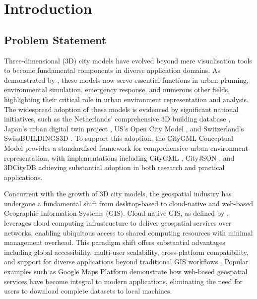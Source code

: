 
\chapter{Introduction}%
\label{introduction}

\section{Problem Statement}
\label{introduction:problem_statement}
Three-dimensional (3D) city models have evolved beyond mere visualisation tools to become fundamental components in diverse application domains.
As demonstrated by \citet{biljecki_2015}, these models now serve essential functions in urban planning, environmental simulation, emergency response, and numerous other fields, highlighting their critical role in urban environment representation and analysis.
The widespread adoption of these models is evidenced by significant national initiatives, such as the Netherlands' comprehensive 3D building database \citep{3dbag}, Japan's urban digital twin project \citep{plateau}, US's Open City Model \citep{us_buildings3d}, and Switzerland's SwissBUILDINGS3D \citep{swiss_buildings3d}.
To support this adoption, the CityGML Conceptual Model \citep{CityGML} provides a standardised framework for comprehensive urban environment representation, with implementations including CityGML \citep{CityGML}, CityJSON \citep{cityjson}, and 3DCityDB \citep{3dcitydb} achieving substantial adoption in both research and practical applications.

Concurrent with the growth of 3D city models, the geospatial industry has undergone a fundamental shift from desktop-based to cloud-native and web-based Geographic Information Systems (GIS).
Cloud-native GIS, as defined by \citet{nist_cloud_computing_2011}, leverages cloud computing infrastructure to deliver geospatial services over networks, enabling ubiquitous access to shared computing resources with minimal management overhead.
This paradigm shift offers substantial advantages including global accessibility, multi-user scalability, cross-platform compatibility, and support for diverse applications beyond traditional GIS workflows \citep{esri_webgis}.
Popular examples such as Google Maps Platform \citep{google_maps_platform} demonstrate how web-based geospatial services have become integral to modern applications, eliminating the need for users to download complete datasets to local machines.

